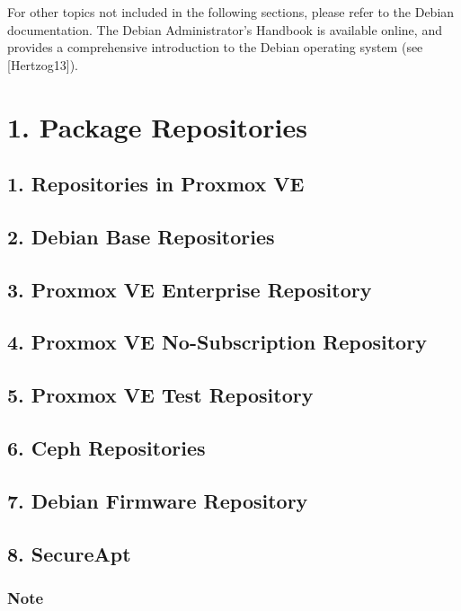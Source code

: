 For other topics not included in the following sections, please refer to the Debian documentation. The Debian Administrator's Handbook is available online, and provides a comprehensive introduction to the Debian operating system (see [Hertzog13]).


\section{1. Package Repositories}

\subsection{1. Repositories in Proxmox VE}

\subsection{2. Debian Base Repositories}

\subsection{3. Proxmox VE Enterprise Repository}

\subsection{4. Proxmox VE No-Subscription Repository}

\subsection{5. Proxmox VE Test Repository}

\subsection{6. Ceph Repositories}

\subsection{7. Debian Firmware Repository}

\subsection{8. SecureApt}

\subsubsection{Note}


